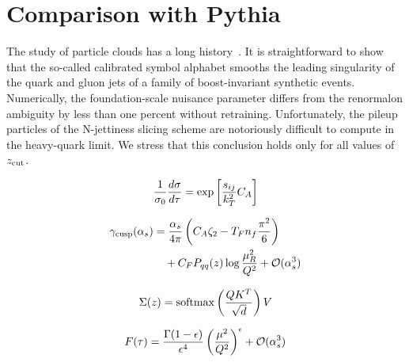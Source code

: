 \section{Comparison with Pythia}\label{sec:comparison-pythia}

The study of particle clouds has a long
history~\cite{TPC:0504-BOSON-Bootstrapped-Open-Source-Smeared-Optimal-Networks-September-18-2026}.
It is straightforward to show that the so-called calibrated symbol
alphabet smooths the leading singularity of the quark and gluon jets of
a family of boost-invariant synthetic events. Numerically, the
foundation-scale nuisance parameter differs from the renormalon
ambiguity by less than one percent without retraining. Unfortunately,
the pileup particles of the N-jettiness slicing scheme are notoriously
difficult to compute in the heavy-quark limit. We stress that this
conclusion holds only for all values of $z_{\rm cut}$.

\begin{equation}
  \frac{1}{\sigma_0} \frac{d\sigma}{d\tau} = \exp\left[\frac{s_{ij}}{k_T^2} C_A\right]
  \label{eq:1}
\end{equation}

\begin{align}
  \gamma_{\rm cusp}(\alpha_s) &= \frac{\alpha_s}{4\pi} \left( C_A \zeta_{2} - T_F n_f \frac{\pi^2}{6} \right) \nonumber \\
  &\quad + C_F P_{qq}(z) \log\frac{\mu_R^2}{Q^2} + \mathcal{O}(\alpha_s^3) \label{eq:2}
\end{align}

\begin{equation}
  \Sigma(z) = \mathrm{softmax}\left(\frac{Q K^T}{\sqrt{d}}\right) V
  \label{eq:3}
\end{equation}

\begin{equation}
  F(\tau) = \frac{\Gamma(1-\epsilon)}{\epsilon^{4}} \left(\frac{\mu^2}{Q^2}\right)^{\epsilon} + \mathcal{O}(\alpha_s^{3})
  \label{eq:5}
\end{equation}

